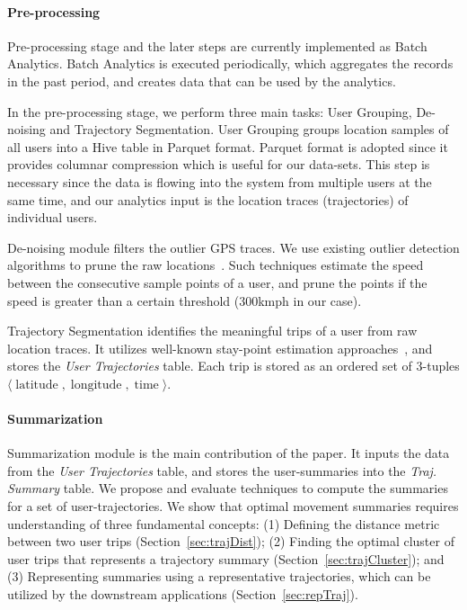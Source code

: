 \paragraph{Pre-processing}
\label{sec:preprocess}
Pre-processing stage and the later steps are currently implemented as Batch Analytics. Batch Analytics is executed periodically, which aggregates the records in the past period, and creates data that can be used by the analytics.

In the pre-processing stage, we perform three main tasks: User Grouping, De-noising and Trajectory Segmentation. User Grouping groups location samples of all users into a Hive table in Parquet format. Parquet format is adopted since it provides columnar compression which is useful for our data-sets. This step is necessary since the data is flowing into the system from multiple users at the same time, and our analytics input is the location traces (trajectories) of individual users.

De-noising module filters the outlier GPS traces. We use existing outlier detection algorithms to prune the raw locations~\cite{Yuan2013,Zheng2009}. Such techniques estimate the speed between the consecutive sample points of a user, and prune the points if the speed is greater than a certain threshold (\unit{300}{kmph} in our case).

Trajectory Segmentation identifies the meaningful trips of a user from raw location traces. It utilizes well-known stay-point estimation approaches~\cite{trajcut3}, and stores the \textit{User Trajectories} table. Each trip is stored as an ordered set of 3-tuples $\langle \operatorname{latitude},\operatorname{longitude}, \operatorname{time} \rangle$.

\paragraph{Summarization}
Summarization module is the main contribution of the paper. It inputs the data from the \textit{User Trajectories} table, and stores the user-summaries into the \textit{Traj. Summary} table. We propose and evaluate techniques to compute the summaries for a set of user-trajectories. We show that optimal movement summaries requires understanding of three fundamental concepts: (1) Defining the distance metric between two user trips (Section~\ref{sec:trajDist}); (2) Finding the optimal cluster of user trips that represents a trajectory summary (Section~\ref{sec:trajCluster}); and (3) Representing summaries using a representative trajectories, which can be utilized by the downstream applications (Section~\ref{sec:repTraj}). 

